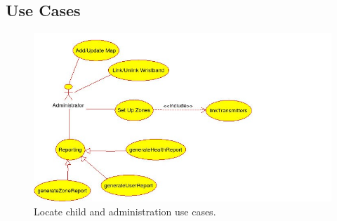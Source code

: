 \documentclass[11pt,titlepage]{article}
\begin{document}
\subsection{Use Cases}
\begin{figure}[H]
\includegraphics[scale=0.9]{UseCase2.jpg}
\caption{Locate child and administration use cases.}
\end{figure}
\end{document}
